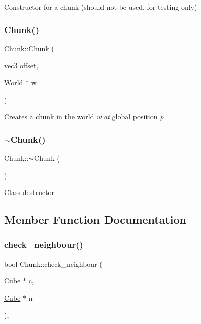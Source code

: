 Constructor for a chunk (should not be used, for testing only) \mbox{\label{classChunk_a2f6fc0e3c9306d4dd7209b236305c7ad}} 
\subsubsection{\texorpdfstring{Chunk()}{Chunk()}\hspace{0.1cm}{\footnotesize\ttfamily [3/3]}}
{\footnotesize\ttfamily Chunk\+::\+Chunk (\begin{DoxyParamCaption}\item[{vec3}]{offset,  }\item[{\mbox{\hyperlink{classWorld}{World}} $\ast$}]{w }\end{DoxyParamCaption})}

Creates a chunk in the world {\itshape w} {\itshape at} global position {\itshape p} {\itshape } \mbox{\label{classChunk_ad21b515f41c9a1d21740b9e7e3f8eede}} 
\subsubsection{\texorpdfstring{$\sim$\+Chunk()}{~Chunk()}}
{\footnotesize\ttfamily Chunk\+::$\sim$\+Chunk (\begin{DoxyParamCaption}{ }\end{DoxyParamCaption})}

Class destructor 

\subsection{Member Function Documentation}
\mbox{\label{classChunk_a6156a96628c9077e34edb0da50f4e4d2}} 
\subsubsection{\texorpdfstring{check\+\_\+neighbour()}{check\_neighbour()}}
{\footnotesize\ttfamily bool Chunk\+::check\+\_\+neighbour (\begin{DoxyParamCaption}\item[{\mbox{\hyperlink{classCube}{Cube}} $\ast$}]{c,  }\item[{\mbox{\hyperlink{classCube}{Cube}} $\ast$}]{n }\end{DoxyParamCaption})\hspace{0.3cm}{\ttfamily [inline]}, {\ttfamily [private]}}


